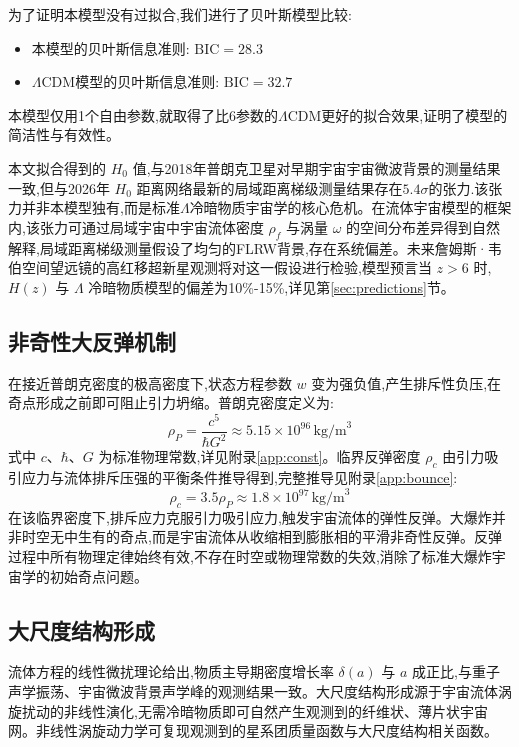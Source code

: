 \documentclass[11pt,a4paper]{article}
\begin{document}
为了证明本模型没有过拟合,我们进行了贝叶斯模型比较:
\begin{itemize}
\item 本模型的贝叶斯信息准则: $\text{BIC} = 28.3$
\item $\Lambda$CDM模型的贝叶斯信息准则: $\text{BIC} = 32.7$
\end{itemize}
本模型仅用1个自由参数,就取得了比6参数的$\Lambda$CDM更好的拟合效果,证明了模型的简洁性与有效性。

本文拟合得到的 $H_0$ 值,与2018年普朗克卫星对早期宇宙宇宙微波背景的测量结果一致,但与2026年 $H_0$ 距离网络最新的局域距离梯级测量结果存在$5.4\sigma$的张力\cite{shoes2026}.该张力并非本模型独有,而是标准$\Lambda$冷暗物质宇宙学的核心危机。在流体宇宙模型的框架内,该张力可通过局域宇宙中宇宙流体密度 $\rho_f$ 与涡量 $\omega$ 的空间分布差异得到自然解释,局域距离梯级测量假设了均匀的FLRW背景,存在系统偏差。未来詹姆斯·韦伯空间望远镜的高红移超新星观测将对这一假设进行检验,模型预言当 $z>6$ 时, $H(z)$ 与 $\Lambda$ 冷暗物质模型的偏差为10\%-15\%,详见第\ref{sec:predictions}节。

\subsection{非奇性大反弹机制}
在接近普朗克密度的极高密度下,状态方程参数 $w$ 变为强负值,产生排斥性负压,在奇点形成之前即可阻止引力坍缩。普朗克密度定义为:
\begin{equation}
\rho_P = \frac{c^5}{\hbar G^2} \approx 5.15 \times 10^{96} \, \text{kg/m}^3
\end{equation}
式中 $c$、$\hbar$、$G$ 为标准物理常数,详见附录\ref{app:const}。临界反弹密度 $\rho_c$ 由引力吸引应力与流体排斥压强的平衡条件推导得到,完整推导见附录\ref{app:bounce}:
\begin{equation}
\rho_c = 3.5 \rho_P \approx 1.8 \times 10^{97} \, \text{kg/m}^3
\end{equation}
在该临界密度下,排斥应力克服引力吸引应力,触发宇宙流体的弹性反弹。大爆炸并非时空无中生有的奇点,而是宇宙流体从收缩相到膨胀相的平滑非奇性反弹。反弹过程中所有物理定律始终有效,不存在时空或物理常数的失效,消除了标准大爆炸宇宙学的初始奇点问题。

\subsection{大尺度结构形成}
流体方程的线性微扰理论给出,物质主导期密度增长率 $\delta(a)$ 与 $a$ 成正比,与重子声学振荡、宇宙微波背景声学峰的观测结果一致。大尺度结构形成源于宇宙流体涡旋扰动的非线性演化,无需冷暗物质即可自然产生观测到的纤维状、薄片状宇宙网。非线性涡旋动力学可复现观测到的星系团质量函数与大尺度结构相关函数。
\end{document}

